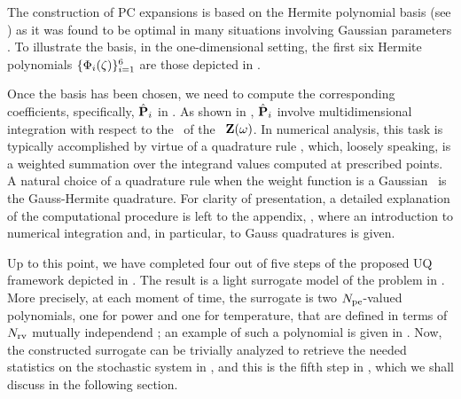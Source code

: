 
The construction of PC expansions is based on the Hermite polynomial basis (see ) as it was found to be optimal in many situations involving Gaussian parameters \cite{xiu2002}. To illustrate the basis, in the one-dimensional setting, the first six Hermite polynomials $\{ \Phi_i(\zeta) \}_{i = 1}^6$ are those depicted in .

Once the basis has been chosen, we need to compute the corresponding coefficients, specifically, $\hat{\mathbf{P}}_i$ in . As shown in , $\hat{\mathbf{P}}_i$ involve multidimensional integration with respect to the \pdf\ of the \rvs\ $\mathbf{Z}(\omega)$. In numerical analysis, this task is typically accomplished by virtue of a quadrature rule \cite{press2007}, which, loosely speaking, is a weighted summation over the integrand values computed at prescribed points. A natural choice of a quadrature rule when the weight function is a Gaussian \pdf\ is the Gauss-Hermite quadrature. For clarity of presentation, a detailed explanation of the computational procedure is left to the appendix, , where an introduction to numerical integration and, in particular, to Gauss quadratures is given.

Up to this point, we have completed four out of five steps of the proposed UQ framework depicted in . The result is a light surrogate model of the problem in . More precisely, at each moment of time, the surrogate is two ${N_\text{pe}}$-valued polynomials, one for power and one for temperature, that are defined in terms of ${N_\text{rv}}$ mutually independend \rvs; an example of such a polynomial is given in . Now, the constructed surrogate can be trivially analyzed to retrieve the needed statistics on the stochastic system in , and this is the fifth step in , which we shall discuss in the following section.
